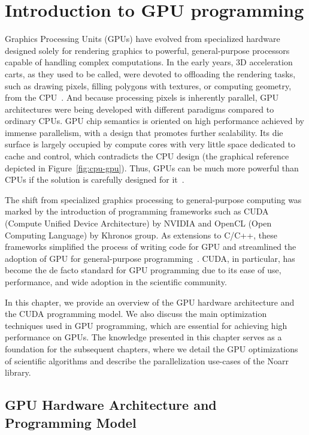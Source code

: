 \chapter{Introduction to GPU programming}
\label{chap:gpu_intro}


Graphics Processing Units (GPUs) have evolved from specialized hardware designed solely for rendering graphics to powerful, general-purpose processors capable of handling complex computations. In the early years, 3D acceleration carts, as they used to be called, were devoted to offloading the rendering tasks, such as drawing pixels, filling polygons with textures, or computing geometry, from the CPU~\cite{pratx2011gpu}. And because processing pixels is inherently parallel, GPU architectures were being developed with different paradigms compared to ordinary CPUs. GPU chip semantics is oriented on high performance achieved by immense parallelism, with a design that promotes further scalability. Its die surface is largely occupied by compute cores with very little space dedicated to cache and control, which contradicts the CPU design (the graphical reference depicted in Figure~\ref{fig:cpu-gpu}). Thus, GPUs can be much more powerful than CPUs if the solution is carefully designed for it~\cite{navarro2014survey}.

The shift from specialized graphics processing to general-purpose computing was marked by the introduction of programming frameworks such as CUDA (Compute Unified Device Architecture) by NVIDIA and OpenCL (Open Computing Language) by Khronos group. As extensions to C/C++, these frameworks simplified the process of writing code for GPU and streamlined the adoption of GPU for general-purpose programming~\cite{croix2009introduction}. CUDA, in particular, has become the de facto standard for GPU programming due to its ease of use, performance, and wide adoption in the scientific community.

In this chapter, we provide an overview of the GPU hardware architecture and the CUDA programming model. We also discuss the main optimization techniques used in GPU programming, which are essential for achieving high performance on GPUs. The knowledge presented in this chapter serves as a foundation for the subsequent chapters, where we detail the GPU optimizations of scientific algorithms and describe the parallelization use-cases of the Noarr library.

\section{GPU Hardware Architecture and Programming Model}
\label{sec:gpu_arch}

